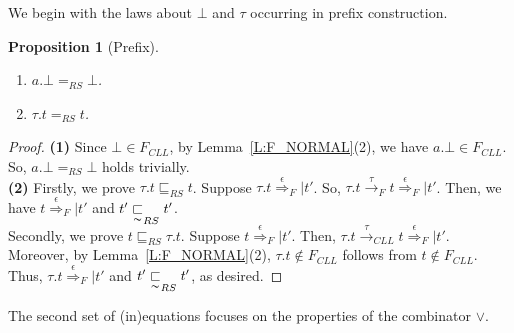 \documentclass{elsarticle}
\theoremstyle{plain}
\newtheorem{proposition}[theorem]{Proposition}
\theoremstyle{definition}
\begin{document}
We begin with the laws about $\bot$ and $\tau$ occurring in prefix construction.

\begin{proposition}[Prefix]\label{S:PREFIX}\hfill
    \begin{enumerate}
      \item $a.\bot =_{RS} \bot$.
      \item $\tau.t =_{RS} t$.
    \end{enumerate}
\end{proposition}
\begin{proof}
\noindent \textbf{(1) }  Since $\bot  \in F_{{CLL}}$, by Lemma~\ref{L:F_NORMAL}(2), we have $a.\bot  \in F_{{CLL}}$. So, $a.\bot =_{RS} \bot$ holds trivially.\\

\noindent \textbf{(2)} Firstly, we prove $\tau.t \sqsubseteq_{RS} t$. Suppose $\tau.t \stackrel{\epsilon}{\Longrightarrow}_F| t'$. So, $\tau.t \stackrel{\tau}{\longrightarrow}_F t \stackrel{\epsilon}{\Longrightarrow}_F| t'$.
Then, we have $t \stackrel{\epsilon}{\Longrightarrow}_F| t'$ and $t'\underset{\thicksim}{\sqsubset}_{RS} t'$.\\

Secondly, we prove $t \sqsubseteq_{RS} \tau.t$.
Suppose $t \stackrel{\epsilon}{\Longrightarrow}_F| t'$.
Then, $\tau.t \stackrel{\tau}{\longrightarrow}_{{CLL}} t \stackrel{\epsilon}{\Longrightarrow}_F| t'$.
Moreover, by Lemma~\ref{L:F_NORMAL}(2), $\tau.t \notin F_{{CLL}}$ follows from  $t \notin F_{{CLL}}$.
Thus, $\tau.t \stackrel{\epsilon}{\Longrightarrow}_F| t'$ and $t'\underset{\thicksim}{\sqsubset}_{RS} t'$, as desired.
\end{proof}

The second set of (in)equations focuses on the properties of the combinator $\vee$.
\end{document}
